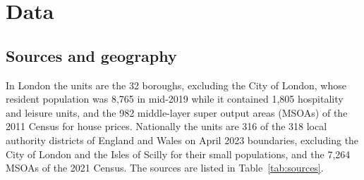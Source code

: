 \documentclass[11pt,a4paper]{article}
\begin{document}
\section{Data}\label{sec:data}

\subsection{Sources and geography}

In London the units are the 32 boroughs, excluding the City of London, whose resident population was 8,765 in mid-2019 while it contained 1,805 hospitality and leisure units, and the 982 middle-layer super output areas (MSOAs) of the 2011 Census for house prices. Nationally the units are 316 of the 318 local authority districts of England and Wales on April 2023 boundaries, excluding the City of London and the Isles of Scilly for their small populations, and the 7,264 MSOAs of the 2021 Census. The sources are listed in Table~\ref{tab:sources}.
\end{document}

